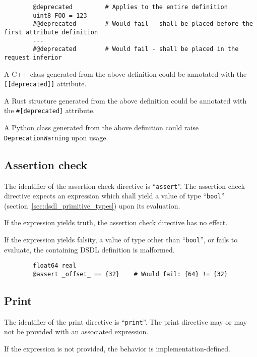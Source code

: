 \begin{remark}
    \begin{verbatim}
        @deprecated         # Applies to the entire definition
        uint8 FOO = 123
        #@deprecated        # Would fail - shall be placed before the first attribute definition
        ---
        #@deprecated        # Would fail - shall be placed in the request inferior
    \end{verbatim}

    A C++ class generated from the above definition could be annotated with the \verb|[[deprecated]]| attribute.

    A Rust structure generated from the above definition could be annotated with the \verb|#[deprecated]| attribute.

    A Python class generated from the above definition could raise \verb|DeprecationWarning| upon usage.
\end{remark}

\subsection{Assertion check}

The identifier of the assertion check directive is ``\verb|assert|''.
The assertion check directive expects an expression which shall yield a value of type
``\verb|bool|'' (section~\ref{sec:dsdl_primitive_types}) upon its evaluation.

If the expression yields truth, the assertion check directive has no effect.

If the expression yields falsity, a value of type other than ``\verb|bool|'', or fails to evaluate,
the containing DSDL definition is malformed.

\begin{remark}
    \begin{verbatim}
        float64 real
        @assert _offset_ == {32}    # Would fail: {64} != {32}
    \end{verbatim}
\end{remark}

\subsection{Print}

The identifier of the print directive is ``\verb|print|''.
The print directive may or may not be provided with an associated expression.

If the expression is not provided, the behavior is implementation-defined.

